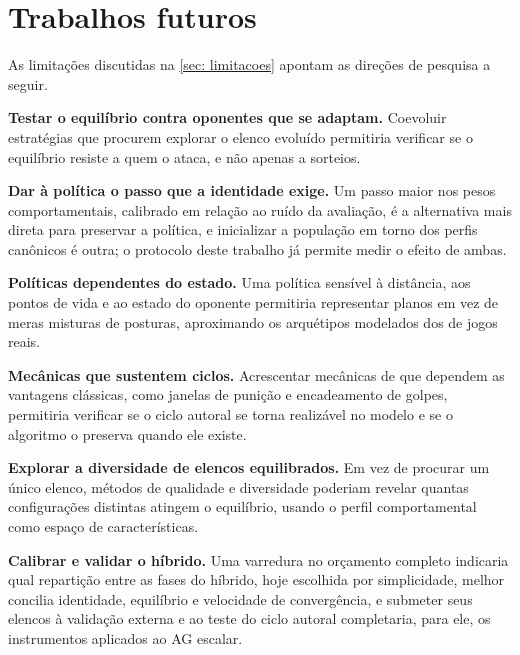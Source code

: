 \section{Trabalhos futuros}

As limitações discutidas na \autoref{sec: limitacoes} apontam as direções de pesquisa a seguir.

\textbf{Testar o equilíbrio contra oponentes que se adaptam.} Coevoluir estratégias que procurem explorar o elenco evoluído \cite{leigh2008coevolution} permitiria verificar se o equilíbrio resiste a quem o ataca, e não apenas a sorteios.

\textbf{Dar à política o passo que a identidade exige.} Um passo maior nos pesos comportamentais, calibrado em relação ao ruído da avaliação, é a alternativa mais direta para preservar a política, e inicializar a população em torno dos perfis canônicos é outra; o protocolo deste trabalho já permite medir o efeito de ambas.

\textbf{Políticas dependentes do estado.} Uma política sensível à distância, aos pontos de vida e ao estado do oponente permitiria representar planos em vez de meras misturas de posturas, aproximando os arquétipos modelados dos de jogos reais.

\textbf{Mecânicas que sustentem ciclos.} Acrescentar mecânicas de que dependem as vantagens clássicas, como janelas de punição e encadeamento de golpes, permitiria verificar se o ciclo autoral se torna realizável no modelo e se o algoritmo o preserva quando ele existe.

\textbf{Explorar a diversidade de elencos equilibrados.} Em vez de procurar um único elenco, métodos de qualidade e diversidade \cite{mouret2015mapelites} poderiam revelar quantas configurações distintas atingem o equilíbrio, usando o perfil comportamental como espaço de características.

\textbf{Calibrar e validar o híbrido.} Uma varredura no orçamento completo indicaria qual repartição entre as fases do híbrido, hoje escolhida por simplicidade, melhor concilia identidade, equilíbrio e velocidade de convergência, e submeter seus elencos à validação externa e ao teste do ciclo autoral completaria, para ele, os instrumentos aplicados ao AG escalar.

